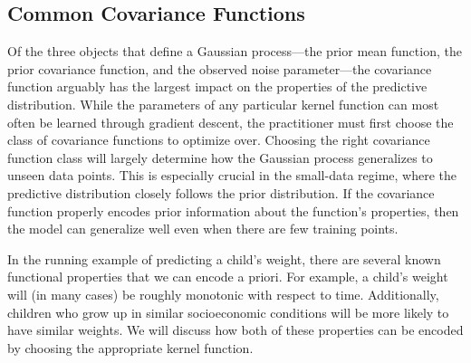 \subsection{Common Covariance Functions}
\label{sec:common_kernels}

Of the three objects that define a Gaussian process---the prior mean function, the prior covariance function, and the observed noise parameter---the covariance function arguably has the largest impact on the properties of the predictive distribution.
While the parameters of any particular kernel function can most often be learned through gradient descent, the practitioner must first choose the class of covariance functions to optimize over.
Choosing the right covariance function class will largely determine how the Gaussian process generalizes to unseen data points.
This is especially crucial in the small-data regime, where the predictive distribution closely follows the prior distribution.
If the covariance function properly encodes prior information about the function's properties, then the model can generalize well even when there are few training points.

In the running example of predicting a child's weight, there are several known functional properties that we can encode a priori.
For example, a child's weight will (in many cases) be roughly monotonic with respect to time.
Additionally, children who grow up in similar socioeconomic conditions will be more likely to have similar weights.
We will discuss how both of these properties can be encoded by choosing the appropriate kernel function.

